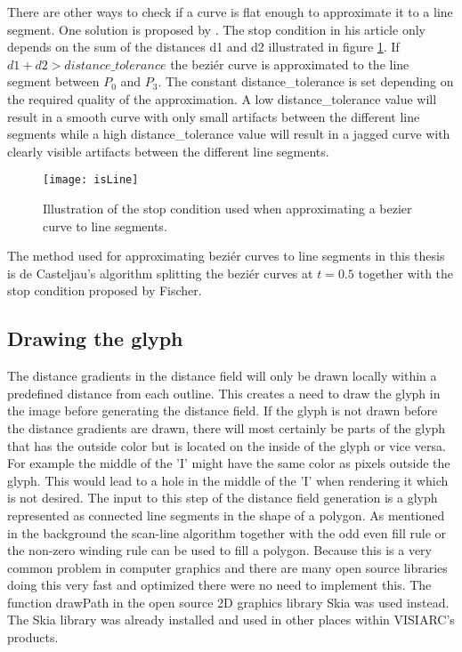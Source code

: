 There are other ways to check if a curve is flat enough to approximate it to a line segment. One solution is proposed by \citet{bezier_subdivision}. The stop condition in his article only depends on the sum of the distances d1 and d2 illustrated in figure \ref{fig:isLine}. If $d1+d2>distance\_tolerance$ the beziér curve is approximated to the line segment between $P_0$ and $P_3$. The constant distance\_tolerance is set depending on the required quality of the approximation. A low distance\_tolerance value will result in a smooth curve with only small artifacts between the different line segments while a high distance\_tolerance value will result in a jagged curve with clearly visible artifacts between the different line segments.

\begin{figure}[H]
\texttt{[image: isLine]}
\caption{Illustration of the stop condition used when approximating a bezier curve to line segments.}
\label{fig:isLine}
\end{figure}

The method used for approximating beziér curves to line segments in this thesis is de Casteljau's algorithm splitting the beziér curves at $t=0.5$ together with the stop condition proposed by Fischer.

\subsection{Drawing the glyph}
The distance gradients in the distance field will only be drawn locally within a predefined distance from each outline. This creates a need to draw the glyph in the image before generating the distance field. If the glyph is not drawn before the distance gradients are drawn, there will most certainly be parts of the glyph that has the outside color but is located on the inside of the glyph or vice versa. For example the middle of the 'I' might have the same color as pixels outside the glyph. This would lead to a hole in the middle of the 'I' when rendering it which is not desired. The input to this step of the distance field generation is a glyph represented as connected line segments in the shape of a polygon. As mentioned in the background the scan-line algorithm together with the odd even fill rule or the non-zero winding rule can be used to fill a polygon. Because this is a very common problem in computer graphics and there are many open source libraries doing this very fast and optimized there were no need to implement this. The function drawPath in the open source 2D graphics library Skia was used instead. The Skia library was already installed and used in other places within VISIARC's products.
